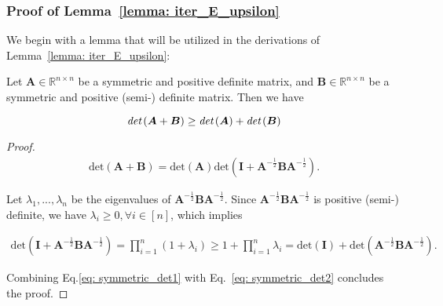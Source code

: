 \subsubsection{Proof of Lemma~\ref{lemma: iter_E_upsilon}}
\label{sec: proof_lemma_iter_E_upsilon}

We begin with a lemma that will be utilized in the derivations of Lemma~\ref{lemma: iter_E_upsilon}:

\begin{lemma}
\label{lemma: symmetric_det}
Let $\boldsymbol{A} \in \mathbb{R}^{n \times n}$ be a symmetric and positive definite matrix, and $\boldsymbol{B} \in \mathbb{R}^{n \times n}$ be a symmetric and positive (semi-) definite matrix. Then we have 

\[
\emph{det} \left( \boldsymbol{A} + \boldsymbol{B} \right) 
\geq
\emph{det} \left( \boldsymbol{A}\right) + \emph{det} \left( \boldsymbol{B}\right) 
\]
\end{lemma}

\begin{proof}

\begin{equation}
\begin{aligned}
\label{eq: symmetric_det1}
\text{det} \left( \boldsymbol{A} + \boldsymbol{B} \right) 
=
\text{det} \left( \boldsymbol{A}\right) 
\text{det} \left( \boldsymbol{I} + \boldsymbol{A}^{-\frac{1}{2}} \boldsymbol{B} \boldsymbol{A}^{-\frac{1}{2}} \right).
\end{aligned}
\end{equation}

Let $\lambda_1, ..., \lambda_n$ be the eigenvalues of $\boldsymbol{A}^{-\frac{1}{2}} \boldsymbol{B} \boldsymbol{A}^{-\frac{1}{2}}$. 
Since $\boldsymbol{A}^{-\frac{1}{2}} \boldsymbol{B} \boldsymbol{A}^{-\frac{1}{2}}$ is positive (semi-) definite, we have $\lambda_i \geq 0, \forall i \in [n]$, which implies

\begin{equation}
\begin{aligned}
\label{eq: symmetric_det2}
\text{det} \left( \boldsymbol{I} + \boldsymbol{A}^{-\frac{1}{2}} \boldsymbol{B} \boldsymbol{A}^{-\frac{1}{2}} \right)
=
\prod_{i=1}^{n} (1 + \lambda_i) 
\geq 
1 + \prod_{i=1}^{n} \lambda_i
= 
\text{det} (\boldsymbol{I}) + \text{det} \left( \boldsymbol{A}^{-\frac{1}{2}} \boldsymbol{B} \boldsymbol{A}^{-\frac{1}{2}} \right).
\end{aligned}
\end{equation}

Combining Eq.\ref{eq: symmetric_det1} with Eq.~\ref{eq: symmetric_det2} concludes the proof.

\end{proof}


